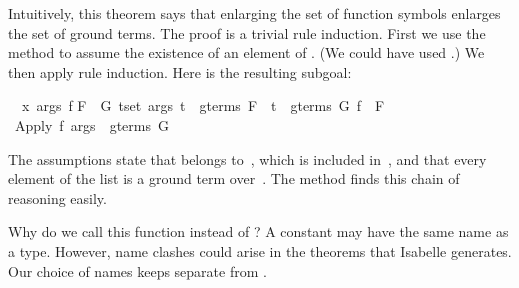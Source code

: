 \begin{isabellebody}
\begin{isamarkuptxt}
Intuitively, this theorem says that
enlarging the set of function symbols enlarges the set of ground 
terms. The proof is a trivial rule induction.
First we use the  method to assume the existence of an element of
.  (We could have used .)  We then
apply rule induction. Here is the resulting subgoal:
\begin{isabelle}%
\ {}{\isachardot}\ {\isasymAnd}x\ args\ f{\isachardot}\isanewline
{}F\ {\isasymsubseteq}\ G{\isacharsemicolon}\ {\isasymforall}t{\isasymin}set\ args{\isachardot}\ t\ {\isasymin}\ gterms\ F\ {\isasymand}\ t\ {\isasymin}\ gterms\ G{\isacharsemicolon}\ f\ {\isasymin}\ F{\isasymrbrakk}\isanewline
{}\ Apply\ f\ args\ {\isasymin}\ gterms\ G%
\end{isabelle}
The assumptions state that  belongs 
to~, which is included in~, and that every element of the list  is
a ground term over~.  The  method finds this chain of reasoning easily.%
\end{isamarkuptxt}%
\isamarkuptrue%
%
\endisatagproof
{\isafoldproof}%
%
\isadelimproof
%
\endisadelimproof
%
\begin{isamarkuptext}%
\begin{warn}
Why do we call this function  instead 
of ?  A constant may have the same name as a type.  However,
name  clashes could arise in the theorems that Isabelle generates. 
Our choice of names keeps  separate from 
.
\end{warn}


\end{isamarkuptext}
\end{isabellebody}
